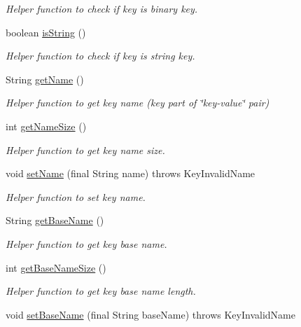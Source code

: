 \begin{DoxyCompactItemize}
\begin{DoxyCompactList}\small\item\em Helper function to check if key is binary key. \end{DoxyCompactList}\item 
boolean \hyperlink{classorg_1_1libelektra_1_1Key_acb0e1141fa920b798a66a2076cd61562}{is\+String} ()
\begin{DoxyCompactList}\small\item\em Helper function to check if key is string key. \end{DoxyCompactList}\item 
String \hyperlink{classorg_1_1libelektra_1_1Key_a668626c8403940015ff5031cfa5e973c}{get\+Name} ()
\begin{DoxyCompactList}\small\item\em Helper function to get key name (key part of \char`\"{}key-\/value\char`\"{} pair) \end{DoxyCompactList}\item 
int \hyperlink{classorg_1_1libelektra_1_1Key_aa6477bb5eb12f739858f285650816cc6}{get\+Name\+Size} ()
\begin{DoxyCompactList}\small\item\em Helper function to get key name size. \end{DoxyCompactList}\item 
void \hyperlink{classorg_1_1libelektra_1_1Key_abd5602765701a10b6a10887c09810cf5}{set\+Name} (final String name)  throws Key\+Invalid\+Name 
\begin{DoxyCompactList}\small\item\em Helper function to set key name. \end{DoxyCompactList}\item 
String \hyperlink{classorg_1_1libelektra_1_1Key_a32c556682f808bbc0a4b676879f6b86f}{get\+Base\+Name} ()
\begin{DoxyCompactList}\small\item\em Helper function to get key base name. \end{DoxyCompactList}\item 
int \hyperlink{classorg_1_1libelektra_1_1Key_a24bd83bcae08b956150d8ae3dafe738e}{get\+Base\+Name\+Size} ()
\begin{DoxyCompactList}\small\item\em Helper function to get key base name length. \end{DoxyCompactList}\item 
void \hyperlink{classorg_1_1libelektra_1_1Key_a5226472bedc6a02dee826ee3facdb25f}{set\+Base\+Name} (final String base\+Name)  throws Key\+Invalid\+Name 

\end{DoxyCompactItemize}
